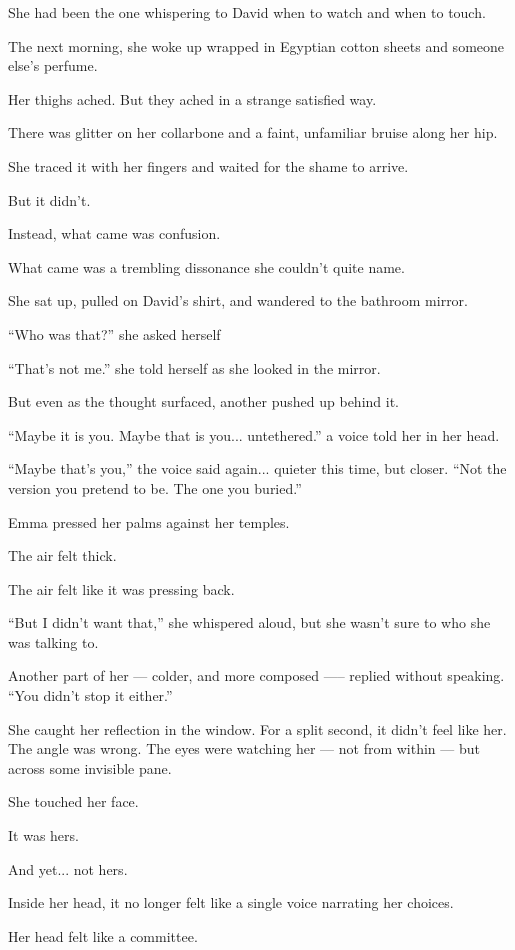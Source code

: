 She had been the one whispering to David when to watch and when to touch.

The next morning, she woke up wrapped in Egyptian cotton sheets and someone else’s perfume. 

Her thighs ached. But they ached in a strange satisfied way. 

There was glitter on her collarbone and a faint, unfamiliar 
bruise along her hip. 

She traced it with her fingers and waited for the shame to arrive.

But it didn’t.

Instead, what came was confusion. 

What came was a trembling dissonance she couldn’t quite name.

She sat up, pulled on David’s shirt, and wandered to the bathroom mirror.

``Who was that?'' she asked herself

``That’s not me.'' she told herself as she looked in the mirror.

But even as the thought surfaced, another pushed up behind it.

``Maybe it is you. Maybe that is you... untethered.'' a voice told her in her head.

``Maybe that’s you,'' the voice said again... quieter this time, but closer. 
``Not the version you pretend to be. The one you buried.''

Emma pressed her palms against her temples. 

The air felt thick. 

The air felt like it was pressing back.

``But I didn’t want that,'' she whispered aloud, but she wasn’t sure to who she was talking to.

Another part of her --- colder, and more composed —-- replied without speaking.
``You didn’t stop it either.''

She caught her reflection in the window. For a split second, it didn’t feel like her. The angle was 
wrong. The eyes were watching her --- not from within --- but across some invisible pane.

She touched her face. 

It was hers. 

And yet... not hers.

Inside her head, it no longer felt like a single voice narrating her choices. 

Her head felt like a committee. 


